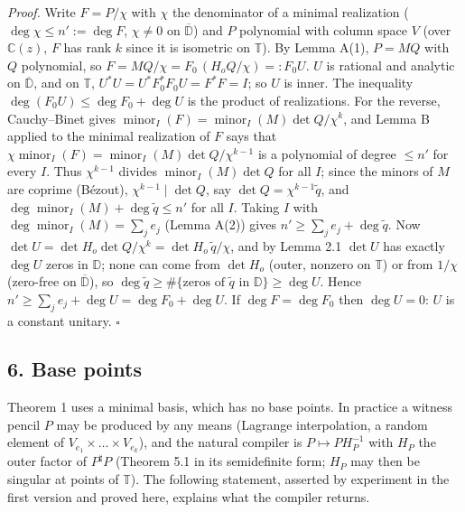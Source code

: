 \documentclass[
  11pt,
  a4paper,
]{article}
\newcounter{none} %
\begin{document}
\emph{Proof.} Write \(F=P/\chi\) with \(\chi\) the denominator of a
minimal realization (\(\deg\chi\le n':=\deg F\), \(\chi\ne0\) on
\(\overline{\mathbb D}\)) and \(P\) polynomial with column space \(V\)
(over \(\mathbb C(z)\), \(F\) has rank \(k\) since it is isometric on
\(\mathbb T\)). By Lemma A(1), \(P=MQ\) with \(Q\) polynomial, so
\(F=MQ/\chi=F_0\,\allowbreak{}(H_oQ/\chi)=:F_0U\). \(U\) is rational and analytic on
\(\overline{\mathbb D}\), and on \(\mathbb T\),
\(U^*U=U^*F_0^*F_0U=F^*F=I\); so \(U\) is inner. The inequality
\(\deg(F_0U)\le\deg F_0+\deg U\) is the product of realizations. For the
reverse, Cauchy--Binet gives
\(\operatorname{minor}_I(F)=\operatorname{minor}_I(M)\det Q/\chi^k\),
and Lemma B applied to the minimal realization of \(F\) says that
\(\chi\operatorname{minor}_I(F)=\operatorname{minor}_I(M)\det Q/\chi^{k-1}\)
is a polynomial of degree \(\le n'\) for every \(I\). Thus
\(\chi^{k-1}\) divides \(\operatorname{minor}_I(M)\det Q\) for all
\(I\); since the minors of \(M\) are coprime (Bézout),
\(\chi^{k-1}\mid\det Q\), say \(\det Q=\chi^{k-1}\tilde q\), and
\(\deg\operatorname{minor}_I(M)+\deg\tilde q\le n'\) for all \(I\).
Taking \(I\) with \(\deg\operatorname{minor}_I(M)=\sum_je_j\) (Lemma
A(2)) gives \(n'\ge\sum_je_j+\deg\tilde q\). Now
\(\det U=\det H_o\det Q/\chi^k=\det H_o\,\allowbreak{}\tilde q/\chi\), and by Lemma
2.1 \(\det U\) has exactly \(\deg U\) zeros in \(\mathbb D\); none can
come from \(\det H_o\) (outer, nonzero on \(\mathbb T\)) or from
\(1/\chi\) (zero-free on \(\overline{\mathbb D}\)), so
\(\deg\tilde q\ge\#\{\text{zeros of }\tilde q\text{ in }\mathbb D\}\ge\deg U\).
Hence \(n'\ge\sum_je_j+\deg U=\deg F_0+\deg U\). If \(\deg F=\deg F_0\)
then \(\deg U=0\): \(U\) is a constant unitary. \(\square\)

\subsection{6. Base points}\label{base-points}

Theorem 1 uses a minimal basis, which has no base points. In practice a
witness pencil \(P\) may be produced by any means (Lagrange
interpolation, a random element of
\(V_{e_1}\times\dots\times V_{e_k}\)), and the natural compiler is
\(P\mapsto PH_P^{-1}\) with \(H_P\) the outer factor of \(P^\sharp P\)
(Theorem 5.1 in its semidefinite form; \(H_P\) may then be singular at
points of \(\mathbb T\)). The following statement, asserted by
experiment in the first version and proved here, explains what the
compiler returns.
\end{document}
